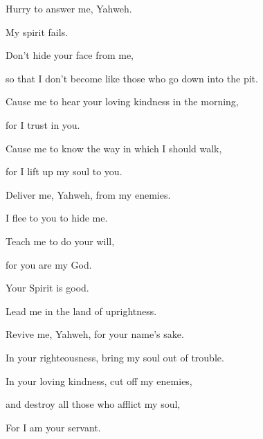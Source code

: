 {\Q {}Hurry to answer me, Yahweh.
\par }{\QB My spirit fails.
\par }{\Q Don’t hide your face from me,
\par }{\QB so that I don’t become like those who go down into the pit.
\par }{\Q {}Cause me to hear your loving kindness in the morning,
\par }{\QB for I trust in you.
\par }{\Q Cause me to know the way in which I should walk,
\par }{\QB for I lift up my soul to you.
\par }{\Q {}Deliver me, Yahweh, from my enemies.
\par }{\QB I flee to you to hide me.
\par }{\Q {}Teach me to do your will,
\par }{\QB for you are my God.
\par }{\Q Your Spirit is good.
\par }{\QB Lead me in the land of uprightness.
\par }{\Q {}Revive me, Yahweh, for your name’s sake.
\par }{\QB In your righteousness, bring my soul out of trouble.
\par }{\Q {}In your loving kindness, cut off my enemies,
\par }{\QB and destroy all those who afflict my soul,
\par }{\QB For I am your servant.

}
